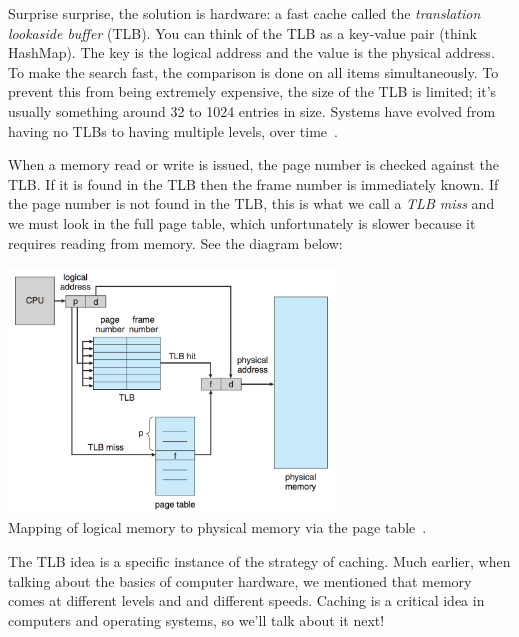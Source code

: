 Surprise surprise, the solution is hardware: a fast cache called the \textit{translation lookaside buffer} (TLB). You can think of the TLB as a key-value pair (think HashMap). The key is the logical address and the value is the physical address. To make the search fast, the comparison is done on all items simultaneously. To prevent this from being extremely expensive, the size of the TLB is limited; it's usually something around 32 to 1024 entries in size. Systems have evolved from having no TLBs to having multiple levels, over time~\cite{osc}.

When a memory read or write is issued, the page number is checked against the TLB. If it is found in the TLB then the frame number is immediately known. If the page number is not found in the TLB, this is what we call a \textit{TLB miss} and we must look in the full page table, which unfortunately is slower because it requires reading from memory. See the diagram below:

\begin{center}
\includegraphics[width=0.65\textwidth]{images/tlb-hardware.png}\\
Mapping of logical memory to physical memory via the page table~\cite{osc}.
\end{center}

The TLB idea is a specific instance of the strategy of caching. Much earlier, when talking about the basics of computer hardware, we mentioned that memory comes at different levels and and different speeds. Caching is a critical idea in computers and operating systems, so we'll talk about it next!



